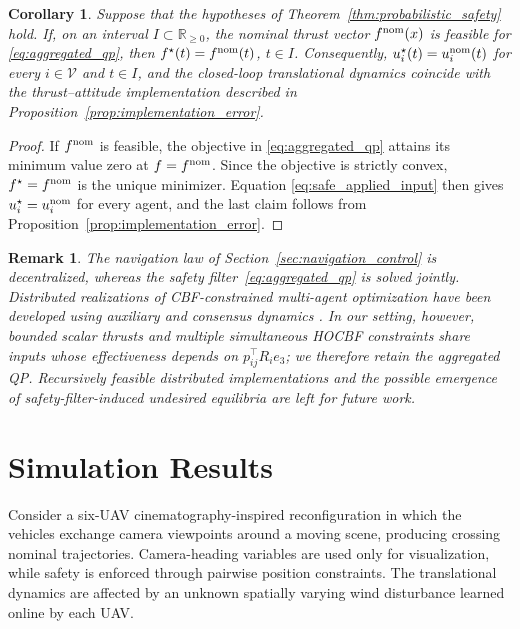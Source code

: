 \documentclass[journal,twoside,web]{ieeecolor}
\newtheorem{corollary}[theorem]{Corollary}
\newtheorem{remark}[theorem]{Remark}
\begin{document}
\begin{corollary}
\label{cor:minimal_intervention}
Suppose that the hypotheses of
Theorem~\ref{thm:probabilistic_safety} hold. If, on an interval
$I\subset\mathbb R_{\geq0}$, the nominal thrust vector
$f^{\rm nom}(x)$ is feasible for
\eqref{eq:aggregated_qp}, then
$f^\star(t)=f^{\rm nom}(t)$, $t\in I$.
Consequently,
$u_i^\star(t)=u_i^{\rm nom}(t)$ for every $i\in\mathcal V$
and $t\in I$, and the closed-loop translational dynamics
coincide with the thrust--attitude implementation described in
Proposition~\ref{prop:implementation_error}.
\end{corollary}

\begin{proof}
If $f^{\rm nom}$ is feasible, the objective in
\eqref{eq:aggregated_qp} attains its minimum value zero at
$f=f^{\rm nom}$. Since the objective is strictly convex,
$f^\star=f^{\rm nom}$ is the unique minimizer. Equation
\eqref{eq:safe_applied_input} then gives
$u_i^\star=u_i^{\rm nom}$ for every agent, and the last claim
follows from Proposition~\ref{prop:implementation_error}.
\end{proof}

\begin{remark}
The navigation law of Section~\ref{sec:navigation_control} is decentralized, whereas the
safety filter~\eqref{eq:aggregated_qp} is solved jointly. Distributed
realizations of CBF-constrained multi-agent optimization have been
developed using auxiliary and consensus dynamics
\cite{TanDimarogonasDistributed,MestresDistributedCBF}.
In our setting, however, bounded scalar thrusts and multiple
simultaneous HOCBF constraints share inputs whose effectiveness
depends on $p_{ij}^{\top}R_i e_3$; we therefore retain the aggregated
QP. Recursively feasible distributed implementations and the possible
emergence of safety-filter-induced undesired equilibria
\cite{TanDimarogonasUndesired,MestresSafetyFilters} are left for
future work.
\end{remark}


\section{Simulation Results}
\label{sec:simulations}

Consider a six-UAV cinematography-inspired reconfiguration in which
the vehicles exchange camera viewpoints around a moving scene,
producing crossing nominal trajectories. Camera-heading variables are
used only for visualization, while safety is enforced through pairwise
position constraints. The translational dynamics are affected by an
unknown spatially varying wind disturbance learned online by each UAV.
\end{document}
